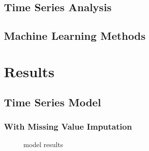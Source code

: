 \documentclass[
]{article}
\begin{document}
\subsection{Time Series Analysis}\label{time-series-analysis}

\subsection{Machine Learning Methods}\label{machine-learning-methods}

\section{Results}\label{results}

\subsection{Time Series Model}\label{time-series-model}

\subsubsection{With Missing Value Imputation}\label{with-missing-value-imputation}

\begin{figure}[H]

{\centering {}

}

\caption{model results}\label{fig:ts}
\end{figure}
\end{document}
